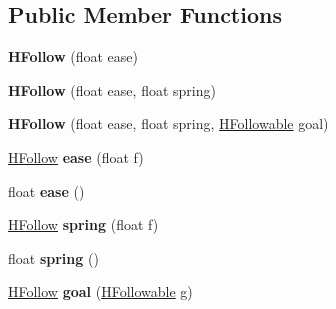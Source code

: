 \subsection*{Public Member Functions}
\begin{DoxyCompactItemize}
\item 
\hypertarget{classhype_1_1behavior_1_1_h_follow_a005b6d747a0d4ffa8684404743f4e58f}{{\bfseries H\-Follow} (float ease)}\label{classhype_1_1behavior_1_1_h_follow_a005b6d747a0d4ffa8684404743f4e58f}

\item 
\hypertarget{classhype_1_1behavior_1_1_h_follow_ad39ebcb66c1fd855c241d15718bbf78c}{{\bfseries H\-Follow} (float ease, float spring)}\label{classhype_1_1behavior_1_1_h_follow_ad39ebcb66c1fd855c241d15718bbf78c}

\item 
\hypertarget{classhype_1_1behavior_1_1_h_follow_a82bbd3407b987eed3bf195e3d1a95513}{{\bfseries H\-Follow} (float ease, float spring, \hyperlink{interfacehype_1_1interfaces_1_1_h_followable}{H\-Followable} goal)}\label{classhype_1_1behavior_1_1_h_follow_a82bbd3407b987eed3bf195e3d1a95513}

\item 
\hypertarget{classhype_1_1behavior_1_1_h_follow_a6b5ca40e84fc988fe0cdedac8d525e01}{\hyperlink{classhype_1_1behavior_1_1_h_follow}{H\-Follow} {\bfseries ease} (float f)}\label{classhype_1_1behavior_1_1_h_follow_a6b5ca40e84fc988fe0cdedac8d525e01}

\item 
\hypertarget{classhype_1_1behavior_1_1_h_follow_ad0afa0281b5c0ce0c1bcb9598f43daac}{float {\bfseries ease} ()}\label{classhype_1_1behavior_1_1_h_follow_ad0afa0281b5c0ce0c1bcb9598f43daac}

\item 
\hypertarget{classhype_1_1behavior_1_1_h_follow_a79e58c28c4c3c36ed12c34547facfde6}{\hyperlink{classhype_1_1behavior_1_1_h_follow}{H\-Follow} {\bfseries spring} (float f)}\label{classhype_1_1behavior_1_1_h_follow_a79e58c28c4c3c36ed12c34547facfde6}

\item 
\hypertarget{classhype_1_1behavior_1_1_h_follow_a51a1cb2abc314c1ace9f62207f8c9295}{float {\bfseries spring} ()}\label{classhype_1_1behavior_1_1_h_follow_a51a1cb2abc314c1ace9f62207f8c9295}

\item 
\hypertarget{classhype_1_1behavior_1_1_h_follow_a100935196d6a2f30c346669e740c6d93}{\hyperlink{classhype_1_1behavior_1_1_h_follow}{H\-Follow} {\bfseries goal} (\hyperlink{interfacehype_1_1interfaces_1_1_h_followable}{H\-Followable} g)}\label{classhype_1_1behavior_1_1_h_follow_a100935196d6a2f30c346669e740c6d93}


\end{DoxyCompactItemize}
